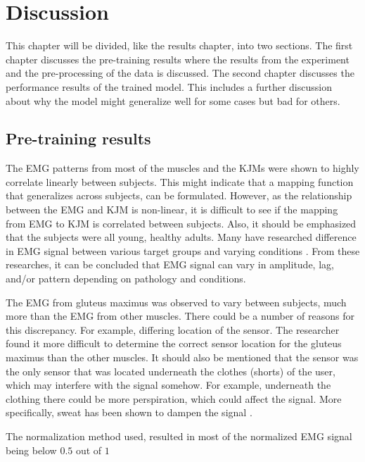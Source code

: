 \documentclass[../main.tex]{subfiles}
\begin{document}
\chapter{Discussion}
\label{sec:discussion}
This chapter will be divided, like the results chapter, into two sections. 
The first chapter discusses the pre-training results where the results from the experiment and the pre-processing of the data is discussed.
The second chapter discusses the performance results of the trained model.
This includes a further discussion about why the model might generalize well for some cases but bad for others.

\section{Pre-training results}
\label{sec:discussion_pre-training-results}
The \ac{EMG} patterns from most of the muscles and the \acp{KJM} were shown to highly correlate linearly between subjects.
This might indicate that a mapping function that generalizes across subjects, can be formulated.
However, as the relationship between the \ac{EMG} and \ac{KJM} is non-linear, it is difficult to see if the mapping from \ac{EMG} to \ac{KJM} is correlated between subjects.
Also, it should be emphasized that the subjects were all young, healthy adults.
Many have researched difference in \ac{EMG} signal between various target groups and varying conditions \cite{Courtine2003,Rezgui2013,Sacco2010, Zwaan2012}.
From these researches, it can be concluded that \ac{EMG} signal can vary in amplitude, lag, and/or pattern depending on pathology and conditions.

The \ac{EMG} from gluteus maximus was observed to vary between subjects, much more than the \ac{EMG} from other muscles.
There could be a number of reasons for this discrepancy.
For example, differing location of the sensor.
The researcher found it more difficult to determine the correct sensor location for the gluteus maximus than the other muscles.
It should also be mentioned that the sensor was the only sensor that was located underneath the clothes (shorts) of the user, which may interfere with the signal somehow.
For example, underneath the clothing there could be more perspiration, which could affect the signal.
More specifically, sweat has been shown to dampen the signal \cite{Abdoli-Eramaki2012}.

The normalization method used, resulted in most of the normalized \ac{EMG} signal being below $0.5$ out of $1$
\end{document}

